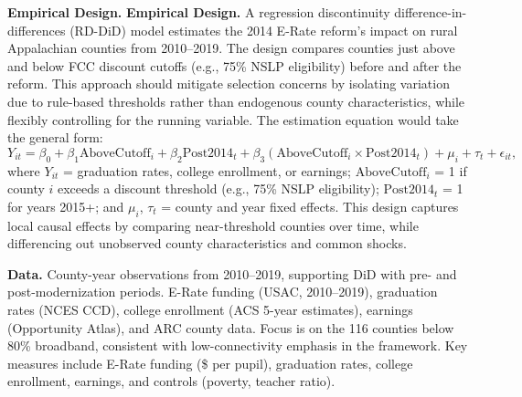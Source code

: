 \textbf{Empirical Design.} \textbf{Empirical Design.} A regression discontinuity difference-in-differences (RD-DiD) model estimates the 2014 E-Rate reform’s impact on rural Appalachian counties from 2010–2019. The design compares counties just above and below FCC discount cutoffs (e.g., 75\% NSLP eligibility) before and after the reform. This approach should mitigate selection concerns by isolating variation due to rule-based thresholds rather than endogenous county characteristics, while flexibly controlling for the running variable. The estimation equation would take the general form:
\[
Y_{it} = \beta_0 + \beta_1 \text{AboveCutoff}_i + \beta_2 \text{Post2014}_t + \beta_3 (\text{AboveCutoff}_i \times \text{Post2014}_t)  + \mu_i + \tau_t + \epsilon_{it},
\]
where $Y_{it}$ = graduation rates, college enrollment, or earnings; $\text{AboveCutoff}_i$ = 1 if county $i$ exceeds a discount threshold (e.g., 75\% NSLP eligibility); $\text{Post2014}_t$ = 1 for years 2015+; and $\mu_i$, $\tau_t$ = county and year fixed effects. This design captures local causal effects by comparing near-threshold counties over time, while differencing out unobserved county characteristics and common shocks. 

\textbf{Data.} County-year observations from 2010–2019, supporting DiD with pre- and post-modernization periods. E-Rate funding (USAC, 2010–2019), graduation rates (NCES CCD), college enrollment (ACS 5-year estimates), earnings (Opportunity Atlas), and ARC county data. Focus is on the 116 counties below 80\% broadband, consistent with low-connectivity emphasis in the framework. Key measures include E-Rate funding (\$ per pupil), graduation rates, college enrollment, earnings, and controls (poverty, teacher ratio).



